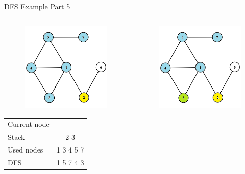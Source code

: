 \documentclass[aspectratio=169]{beamer}%
\begin{document}
\begin{frame}{DFS Example Part 5}
\begin{columns}
\begin{column}{0.32\textwidth}
\begin{figure}[!ht]
                \includegraphics[width=0.9\linewidth]{dfs 14.png}
            \end{figure}
            \begin{table}[ht]
                \centering
                \begin{tabular}{l c}
                    Current node & -\\
                    Stack & 2 3\\ 
                    Used nodes & 1 3 4 5 7\\
                    DFS & 1 5 7 4 3 
                \end{tabular}
            \end{table}
        \end{column}
        \hfill
        \begin{column}{0.32\textwidth}
            \begin{figure}[!ht]
                \centering
                \includegraphics[width=0.9\linewidth]{dfs 15.png}

\end{figure}
\end{column}
\end{columns}
\end{frame}
\end{document}
